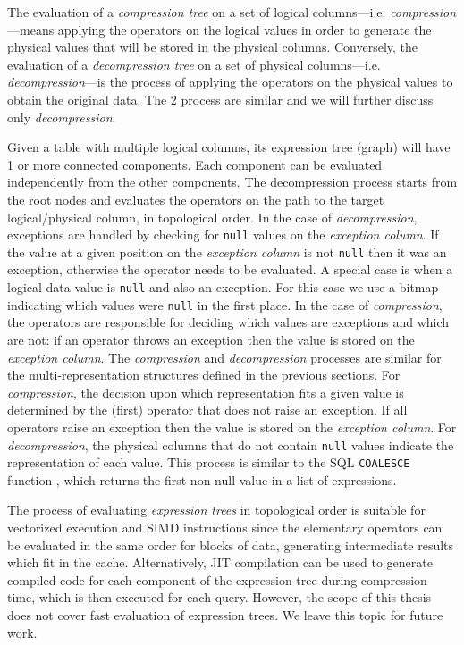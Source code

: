 The evaluation of a \textit{compression tree} on a set of logical columns---i.e. \textit{compression}---means applying the operators on the logical values in order to generate the physical values that will be stored in the physical columns. Conversely, the evaluation of a \textit{decompression tree} on a set of physical columns---i.e. \textit{decompression}---is the process of applying the operators on the physical values to obtain the original data. The 2 process are similar and we will further discuss only \textit{decompression}.

Given a table with multiple logical columns, its expression tree (graph) will have 1 or more connected components. Each component can be evaluated independently from the other components. The decompression process starts from the root nodes and evaluates the operators on the path to the target logical/physical column, in topological order. In the case of \textit{decompression}, exceptions are handled by checking for \verb|null| values on the \textit{exception column}. If the value at a given position on the \textit{exception column} is not \verb|null| then it was an exception, otherwise the operator needs to be evaluated. A special case is when a logical data value is \verb|null| and also an exception. For this case we use a bitmap indicating which values were \verb|null| in the first place. In the case of \textit{compression}, the operators are responsible for deciding which values are exceptions and which are not: if an operator throws an exception then the value is stored on the \textit{exception column}. The \textit{compression} and \textit{decompression} processes are similar for the multi-representation structures defined in the previous sections. For \textit{compression}, the decision upon which representation fits a given value is determined by the (first) operator that does not raise an exception. If all operators raise an exception then the value is stored on the \textit{exception column}. For \textit{decompression}, the physical columns that do not contain \verb|null| values indicate the representation of each value. This process is similar to the SQL \verb|COALESCE| function \cite{sqlcoalesce}, which returns the first non-null value in a list of expressions.

The process of evaluating \textit{expression trees} in topological order is suitable for vectorized execution \cite{kersten2018everything} and SIMD instructions since the elementary operators can be evaluated in the same order for blocks of data, generating intermediate results which fit in the cache. Alternatively, JIT compilation \cite{kersten2018everything} can be used to generate compiled code for each component of the expression tree during compression time, which is then executed for each query. However, the scope of this thesis does not cover fast evaluation of expression trees. We leave this topic for future work.


